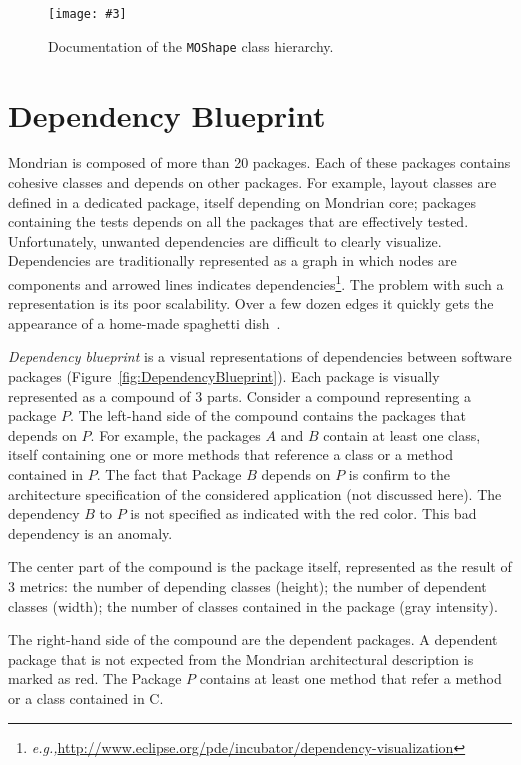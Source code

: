 \documentclass[runningheads]{llncs}
\newcommand{\ct}{\lstinline[backgroundcolor=\color{white},basicstyle=\footnotesize\ttfamily]}
\newcommand{\largefig}[4]{
	\begin{figure*}[#1]
		\centering
		\texttt{[image: \#3]}
		\caption{\label{fig:#3}#4}
	\end{figure*}}
\newcommand{\eg}{\emph{e.g.,}\xspace}
\newcommand{\seclabel}[1]{\label{sec:#1}}
\newcommand{\figref}[1]{Figure~\ref{fig:#1}}
\begin{document}
\largefig{}{1.0}{DocumentationBlueprintEvolution}{Documentation of the \ct{MOShape} class hierarchy.}

\section{Dependency Blueprint}\seclabel{dependencyblueprint}

Mondrian is composed of more than 20 packages. Each of these packages contains cohesive classes and depends on other packages. For example, layout classes are defined in a dedicated package, itself depending on Mondrian core; packages containing the tests depends on all the packages that are effectively tested. Unfortunately, unwanted dependencies are difficult to clearly visualize.
Dependencies are traditionally represented as a graph in which nodes are components and arrowed lines indicates dependencies\footnote{\eg \url{http://www.eclipse.org/pde/incubator/dependency-visualization}}. The problem with such a representation is its poor scalability. Over a few dozen edges it quickly gets the appearance of a home-made spaghetti dish~\cite{Tele10a}. 

\emph{Dependency blueprint} is a visual representations of dependencies between software packages (\figref{DependencyBlueprint}). Each package is visually represented as a compound of 3 parts. Consider a compound representing a package $P$. The left-hand side of the compound contains the packages that depends on $P$. For example, the packages $A$ and $B$ contain at least one class, itself containing one or more methods that reference a class or a method contained in $P$. The fact that Package $B$ depends on $P$ is confirm to the architecture specification of the considered application (not discussed here). The dependency $B$ to $P$ is not specified as indicated with the red color. This bad dependency is an anomaly.

The center part of the compound is the package itself, represented as the result of 3 metrics: the number of depending classes (height); the number of dependent classes (width); the number of classes contained in the package (gray intensity). 

The right-hand side of the compound are the dependent packages. A dependent package that is not expected from the Mondrian architectural description is marked as red. The Package $P$ contains at least one method that refer a method or a class contained in C.
\end{document}
